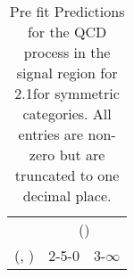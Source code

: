 \begin{table}[h!]
\tiny
\centering
\caption{Pre fit Predictions for the QCD process in the signal region for 2.1\ifb for symmetric categories. All entries are non-zero but are truncated to one decimal place.\label{tab:predsepnaive_sig_qcd_sym}}
\begin{tabular}
{ccc}
	\hline\hline
	& \multicolumn{2}{c}{\scalht (\gev)} \\ 
	 (\njet,  \nb) & 2-5-0 & 3-$\infty$ \\ [0.8ex] 
\hline
	\hline
	\hline
\end{tabular}
\end{table}
